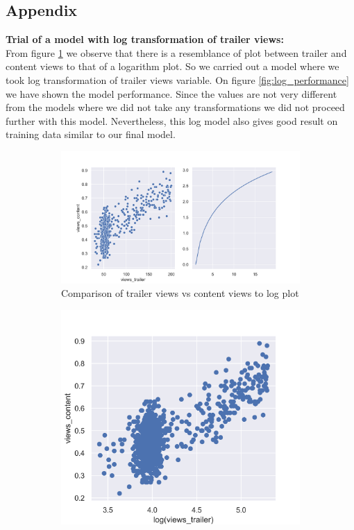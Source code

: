 \documentclass[12pt,a4paper]{style}
\begin{document}
\subsection{Appendix}
\small{\textbf{Trial of a model with log transformation of trailer views:}}\\
From figure \ref{fig:log_comparison} we observe that there is a resemblance of plot between trailer and content views to that of a logarithm plot. So we carried out a model where we took log transformation of trailer views variable. On figure \ref{fig:log_performance} we have shown the model performance. Since the values are not very different from the models where we did not take any transformations we did not proceed further with this model. Nevertheless, this log model also gives good result on training data similar to our final model. 
\begin{figure}[h]
		\centering
	\begin{subfigure}[t]{0.6\textwidth}
		\includegraphics[width=\textwidth]{log_compare.png}
		\caption{Comparison of trailer views vs content views to log plot}
		\label{fig:log_comparison}
	\end{subfigure}
	\hfill
	\begin{subfigure}[t]{0.39\textwidth}
		\centering
		\includegraphics[width=\textwidth]{log_trailer.png}

\end{subfigure}
\end{figure}
\end{document}
